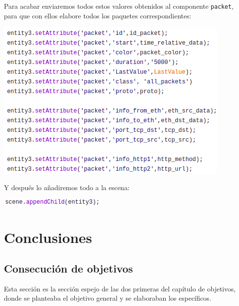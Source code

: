 \documentclass[a4paper, 12pt]{book}
\begin{document}
Para acabar enviaremos todos estos valores obtenidos al componente \texttt{packet}, para que con ellos elabore todos los paquetes correspondientes:

\begin{center}
    \includegraphics[scale=0.7]{img/atribPAckt_comp_netsim.png}
\end{center}

Y después lo añadiremos todo a la escena:

\begin{center}
    \includegraphics[scale=0.7]{img/escenaPack_comp_netsim.png}
\end{center}
    


\cleardoublepage
\chapter{Conclusiones}
\label{chap:conclusiones}

\section{Consecución de objetivos}
\label{sec:consecucion-objetivos}

Esta sección es la sección espejo de las dos primeras del capítulo de objetivos, donde se planteaba el objetivo general y se elaboraban los específicos.
\end{document}

